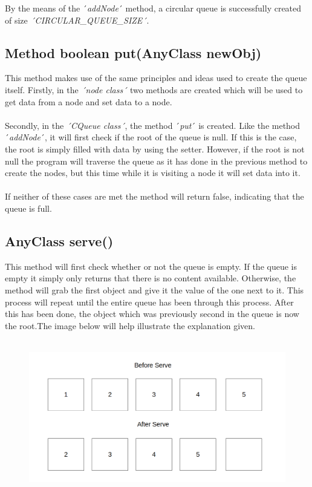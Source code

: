 \documentclass[12pt]{article}
\begin{document}
By the means of the ´\emph{addNode}´ method, a circular queue is successfully created of size \emph{´CIRCULAR\_QUEUE\_SIZE´}.
\bigskip

\subsection{Method boolean put(AnyClass newObj)}
This method makes use of the same principles and ideas used to create the queue itself. Firstly, in the \emph{´node class´} two methods are created which will be used to get data from a node and set data to a node.\\
\\Secondly, in the \emph{´CQueue class´}, the method ´\emph{put}´ is created. Like the method ´\emph{addNode}´, it will first check if the root of the queue is null. If this is the case, the root is simply filled with data by using the setter. However, if the root is not null the program will traverse the queue as it has done in the previous method to create the nodes, but this time while it is visiting a node it will set data into it.\\
\\If neither of these cases are met the method will return false, indicating that the queue is full.
\bigskip

\subsection{AnyClass serve()}
This method will first check whether or not the queue is empty. If the queue is empty it simply only returns that there is no content available. Otherwise, the method will grab the first object and give it the value of the one next to it. This process will repeat until the entire queue has been through this process. After this has been done, the object which was previously second in the queue is now the root.The image below will help illustrate the explanation given.\\
\\
\begin{figure}[h]
\centering
\includegraphics[scale=0.30]{Images/serve.png}
\end{figure}
\bigskip
\end{document}

